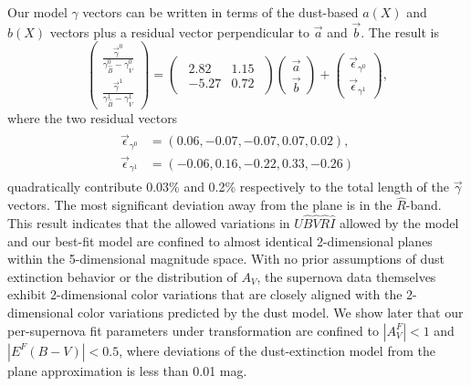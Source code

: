 \documentclass{aastex61}   	%
\begin{document}
Our model $\gamma$ vectors can be written in terms of the 
dust-based $a(X)$ and $b(X)$ vectors plus a residual vector perpendicular to $\vec{a}$ and $\vec{b}$.
The result is
\begin{equation}
\begin{pmatrix}
 \frac{\vec{\gamma}^0}{\gamma^0_{\hat{B}}-\gamma^0_{\hat{V}}} \\
\frac{\vec{\gamma}^1}{\gamma^1_{\hat{B}}-\gamma^1_{\hat{V}}} 
\end{pmatrix}=
\begin{pmatrix}
\begin{array}{rr}
2.82 & 1.15  \\
-5.27 & 0.72
\end{array}
\end{pmatrix} 
\begin{pmatrix}
\vec{a} \\
\vec{b}
\end{pmatrix}+
\begin{pmatrix}
\vec{\epsilon}_{\gamma^0} \\
\vec{\epsilon}_{\gamma^1}
\end{pmatrix},
\label{trans_I:eqn}
\end{equation}
where the two residual vectors
\begin{align}
\begin{split}
\vec{\epsilon}_{\gamma^0} &=(0.06, -0.07, -0.07,  0.07, 0.02), \\
\vec{\epsilon}_{\gamma^1} & =(-0.06, 0.16, -0.22, 0.33, -0.26)
\end{split}
\label{res_I:eqn}
\end{align}
quadratically contribute  0.03\% and 0.2\% respectively to the total  length of the $\vec{\gamma}$ vectors.  The most significant
deviation away from the plane is in the ${\hat{R}}$-band.
This result indicates that
the allowed variations in ${\hat{U}}{\hat{B}}{\hat{V}}{\hat{R}}{\hat{I}}$ allowed by the  model and our best-fit model are confined to almost identical
2-dimensional
planes within
the 5-dimensional magnitude space.
With no prior assumptions of dust extinction behavior or the distribution of $A_V$, the supernova data themselves exhibit
2-dimensional color variations that are closely aligned with the 2-dimensional color variations predicted by the  dust model.
We show later that our per-supernova fit parameters under transformation are confined to $|A^F_V| < 1$ and $|E^F(B-V)| < 0.5$,
where deviations of  the   dust-extinction model from the plane approximation is less than 0.01 mag.
\end{document}
